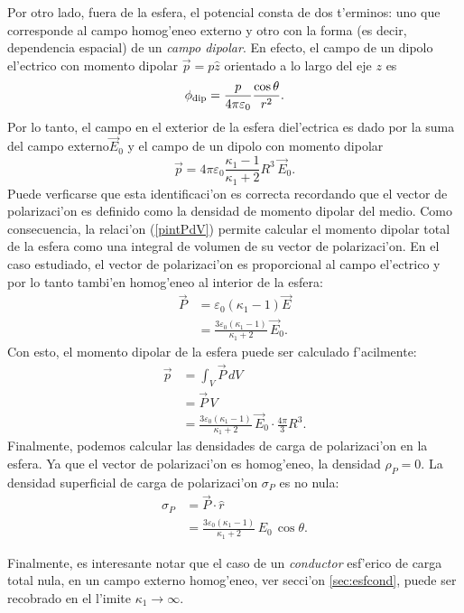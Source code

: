 Por otro lado, fuera de la esfera, el potencial consta de dos t'erminos: uno que corresponde al campo homog'eneo externo y otro con la forma (es decir, dependencia espacial) de un \textit{campo dipolar}. En efecto, el campo de un dipolo el'ectrico con momento dipolar $\vec{p}=p\hat{z}$ orientado a lo largo del eje $z$ es
 \begin{equation}
 \phi_{\rm dip}=\frac{p}{4\pi\varepsilon_0}\frac{\cos\theta}{r^2}.
 \end{equation}
Por lo tanto, el campo en el exterior de la esfera diel'ectrica es dado por la suma del campo externo$\vec{E}_0$ y el campo de un dipolo con momento dipolar
 \begin{equation}
\vec{p}=4\pi\varepsilon_0\frac{\kappa_1-1}{\kappa_1+2}R^3\,\vec{E}_0.
 \end{equation}
Puede verficarse que esta identificaci'on es correcta recordando que el vector de polarizaci'on es definido como la densidad de momento dipolar del medio. Como consecuencia, la relaci'on (\ref{pintPdV}) permite calcular el momento dipolar total de la esfera como una integral de volumen de su vector de polarizaci'on. En el caso estudiado, el vector de polarizaci'on es proporcional al campo el'ectrico y por lo tanto tambi'en homog'eneo al interior de la esfera:
\begin{align}
\vec{P} &= \varepsilon_0(\kappa_1-1)\vec{E} \\
&= \frac{3\varepsilon_0(\kappa_1-1)}{\kappa_1+2}\,\vec{E}_0.
\end{align}
Con esto, el momento dipolar de la esfera puede ser calculado f'acilmente:
\begin{align}
\vec{p} &= \int_V \vec{P}\,dV \\
&= \vec{P}\,V \\
&= \frac{3\varepsilon_0(\kappa_1-1)}{\kappa_1+2}\,\vec{E}_0\cdot \frac{4\pi}{3}R^3.
\end{align}
Finalmente, podemos calcular las densidades de carga de polarizaci'on en la esfera. Ya que el vector de polarizaci'on es homog'eneo, la densidad $\rho_P=0$. La densidad superficial de carga de polarizaci'on $\sigma_P$ es no nula:
\begin{align}
\sigma_P &= \vec{P}\cdot\hat{r}\\
&= \frac{3\varepsilon_0(\kappa_1-1)}{\kappa_1+2}\,E_0\,\cos\theta.
\end{align}

Finalmente, es interesante notar que el caso de un \textit{conductor} esf'erico de carga total nula, en un campo externo homog'eneo, ver secci'on \ref{sec:esfcond}, puede ser recobrado en el l'imite $\kappa_1\to\infty$.

